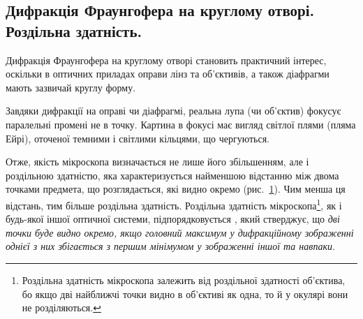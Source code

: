 \subsection*{Дифракція Фраунгофера на круглому отворі. Роздільна здатність.}


Дифракція Фраунгофера на круглому отворі становить практичний інтерес, оскільки в оптичних приладах оправи лінз та об'єктивів, а також діафрагми мають зазвичай круглу форму.


Завдяки дифракції на оправі чи діафрагмі, реальна лупа (чи об'єктив) фокусує паралельні промені не в точку. Картина в фокусі має вигляд світлої плями (пляма Ейрі), оточеної темними і світлими кільцями, що чергуються.

Отже, якість мікроскопа визначається не лише його збільшенням, але і роздільною здатністю, яка характеризується найменшою відстанню між двома точками предмета, що розглядається, які видно окремо (рис.~\ref{pic:lupa_resolution}). Чим менша ця відстань, тим більше роздільна здатність.  Роздільна здатність мікроскопа\footnote{Роздільна здатність мікроскопа залежить від роздільної здатності об'єктива, бо якщо дві найближчі точки видно в об'єктиві як одна, то й у окулярі вони не розділяються.}, як і будь-якої іншої оптичної системи, підпорядковується , який стверджує, що \emph{дві точки буде видно окремо, якщо головний максимум у дифракційному зображенні однієї з них збігається з першим мінімумом у зображенні іншої та навпаки}.


\begin{figure}[ht!]\centering
    
    \caption{}
    \label{pic:lupa_resolution}
\end{figure}

